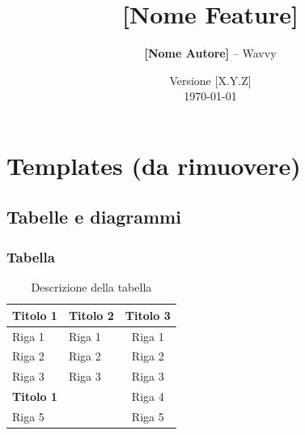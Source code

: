 \documentclass[a4paper,11pt,table,dvipsnames]{article}
\title{\textbf{[Nome Feature]}}
\author{\textbf{[Nome Autore]} -- Wavvy}
\date{Versione [X.Y.Z] \\ \today}
\begin{document}
\maketitle

\tableofcontents

\newpage


\section{Templates (da rimuovere)}

\subsection{Tabelle e diagrammi}

\subsubsection{Tabella}
\begin{table}[H]
      \centering
      \renewcommand{\arraystretch}{1.2}
      \begin{tabular}{@{} l l c @{}}
            \toprule
            \textbf{Titolo 1} & \textbf{Titolo 2} & \textbf{Titolo 3} \\
            \midrule
            Riga 1            & Riga 1            & Riga 1            \\
            Riga 2            & Riga 2            & Riga 2            \\
            Riga 3            & Riga 3            & Riga 3            \\
            \midrule
            \textbf{Titolo 1} &                   & Riga 4            \\
            Riga 5            &                   & Riga 5            \\
            \bottomrule
      \end{tabular}
      \caption{Descrizione della tabella}
      \label{tab:nome_tabella}
\end{table}
\end{document}

